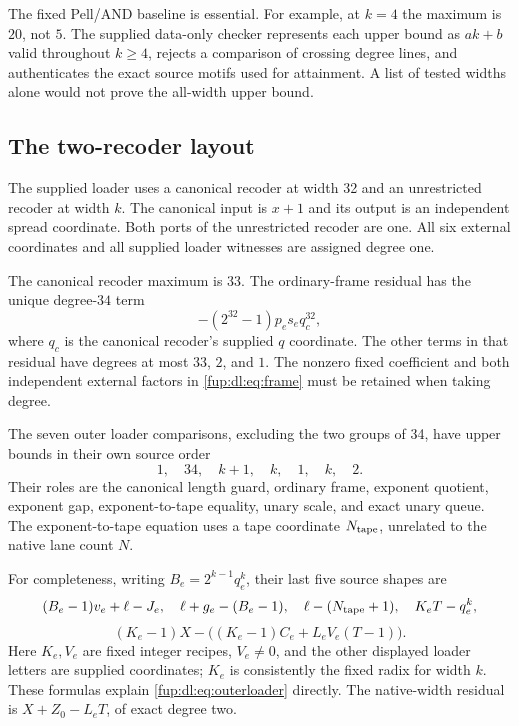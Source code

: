 \documentclass[11pt,letterpaper]{article}
\theoremstyle{definition}\newtheorem{definition}[theorem]{Definition}
\theoremstyle{remark}\newtheorem{remark}[theorem]{Remark}
\begin{document}
The fixed Pell/AND baseline is essential. For example, at $k=4$ the maximum is $20$, not $5$. The supplied data-only checker represents each upper bound as $ak+b$ valid throughout $k\ge4$, rejects a comparison of crossing degree lines, and authenticates the exact source motifs used for attainment. A list of tested widths alone would not prove the all-width upper bound.

\subsection{The two-recoder layout}
The supplied loader uses a canonical recoder at width 32 and an unrestricted recoder at width $k$. The canonical input is $x+1$ and its output is an independent spread coordinate. Both ports of the unrestricted recoder are one. All six external coordinates and all supplied loader witnesses are assigned degree one.

The canonical recoder maximum is $33$. The ordinary-frame residual has the unique degree-$34$ term
\begin{equation}\label{fup:dl:eq:frame}
 -(2^{32}-1)p_es_e q_c^{32},
\end{equation}
where $q_c$ is the canonical recoder's supplied $q$ coordinate. The other terms in that residual have degrees at most $33$, $2$, and $1$. The nonzero fixed coefficient and both independent external factors in \eqref{fup:dl:eq:frame} must be retained when taking degree.

The seven outer loader comparisons, excluding the two groups of 34, have upper bounds in their own source order
\begin{equation}\label{fup:dl:eq:outerloader}
 1,\quad34,\quad k+1,\quad k,\quad1,\quad k,\quad2.
\end{equation}
Their roles are the canonical length guard, ordinary frame, exponent quotient, exponent gap, exponent-to-tape equality, unary scale, and exact unary queue. The exponent-to-tape equation uses a tape coordinate $N_{\rm tape}$, unrelated to the native lane count $N$.

For completeness, writing $B_e=2^{k-1}q_e^k$, their last five source shapes are
\[
 (B_e-1)v_e+\ell-J_e,\quad \ell+g_e-(B_e-1),\quad
 \ell-(N_{\rm tape}+1),\quad K_eT-q_e^k,
\]
\[
 (K_e-1)X-\bigl((K_e-1)C_e+L_eV_e(T-1)\bigr).
\]
Here $K_e,V_e$ are fixed integer recipes, $V_e\ne0$, and the other displayed loader letters are supplied coordinates; $K_e$ is consistently the fixed radix for width $k$. These formulas explain \eqref{fup:dl:eq:outerloader} directly. The native-width residual is $X+Z_0-L_eT$, of exact degree two.
\end{document}
